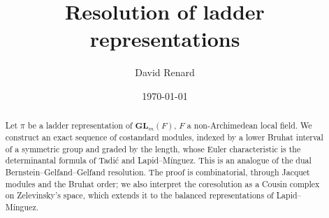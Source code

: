 \documentclass[a4paper,12pt,leqno]{amsart}
\theoremstyle{plain}
\theoremstyle{definition}
\theoremstyle{definition}
\begin{document}


\title{Resolution of ladder representations}
\author{David Renard}
\address{
Centre de Mathématiques \\
Laurent Schwartz
\\ Ecole Polytechnique }
\date{\today}

\begin{abstract}
Let $\pi$ be a ladder representation of $\mathbf{GL}_m(F)$, $F$ a non-Archimedean local field. We
construct an exact sequence of costandard modules, indexed by a lower Bruhat interval of a symmetric
group and graded by the length, whose Euler characteristic is the determinantal formula of Tadi\'c and
Lapid--M\'inguez. This is an analogue of the dual Bernstein--Gelfand--Gelfand resolution. The proof is
combinatorial, through Jacquet modules and the Bruhat order; we also interpret the coresolution as a
Cousin complex on Zelevinsky's space, which extends it to the balanced representations of
Lapid--M\'inguez.
\end{abstract}

\maketitle


\end{document}

